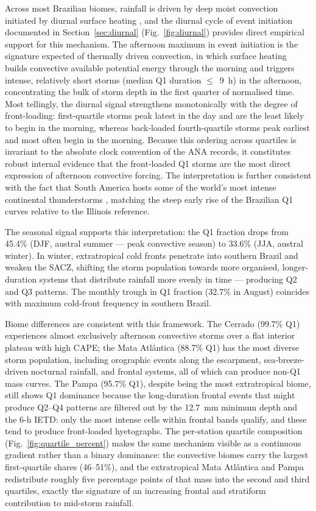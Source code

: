 \documentclass[a4paper,fleqn]{cas-sc}
\begin{document}
Across most Brazilian biomes, rainfall is driven by deep moist
convection initiated by diurnal surface heating \citep{Marengo2012},
and the diurnal cycle of event initiation documented in
Section~\ref{sec:diurnal} (Fig.~\ref{fig:diurnal}) provides direct
empirical support for this mechanism. The afternoon maximum in event
initiation is the signature expected of thermally driven convection, in
which surface heating builds convective available potential energy
through the morning and triggers intense, relatively short storms
(median Q1 duration $\leq$~9~h) in the afternoon, concentrating the bulk
of storm depth in the first quarter of normalised time. Most
tellingly, the diurnal signal strengthens monotonically with the degree
of front-loading: first-quartile storms peak latest in the day and are
the least likely to begin in the morning, whereas back-loaded
fourth-quartile storms peak earliest and most often begin in the
morning. Because this ordering across quartiles is invariant to the
absolute clock convention of the ANA records, it constitutes robust
internal evidence that the front-loaded Q1 storms are the most direct
expression of afternoon convective forcing. The interpretation is
further consistent with the fact that South America hosts some of the
world's most intense continental thunderstorms \citep{Zipser2006},
matching the steep early rise of the Brazilian Q1 curves relative to
the Illinois reference.

The seasonal signal supports this interpretation: the Q1 fraction
drops from 45.4\% (DJF, austral summer — peak convective season)
to 33.6\% (JJA, austral winter). In winter, extratropical cold fronts
penetrate into southern Brazil and weaken the SACZ, shifting the storm
population towards more organised, longer-duration systems that
distribute rainfall more evenly in time — producing Q2 and Q3
patterns. The monthly trough in Q1 fraction (32.7\% in August)
coincides with maximum cold-front frequency in southern Brazil.

Biome differences are consistent with this framework. The Cerrado
(99.7\% Q1) experiences almost exclusively afternoon convective
storms over a flat interior plateau with high CAPE; the Mata Atlântica
(88.7\% Q1) has the most diverse storm population, including
orographic events along the escarpment, sea-breeze-driven nocturnal
rainfall, and frontal systems, all of which can produce non-Q1 mass
curves. The Pampa (95.7\% Q1), despite being the most extratropical
biome, still shows Q1 dominance because the long-duration frontal
events that might produce Q2–Q4 patterns are filtered out by the
12.7~mm minimum depth and the 6-h IETD: only the most intense cells
within frontal bands qualify, and these tend to produce front-loaded
hyetographs. The per-station quartile composition
(Fig.~\ref{fig:quartile_percent}) makes the same mechanism visible as a
continuous gradient rather than a binary dominance: the convective
biomes carry the largest first-quartile shares (46–51\%), and the
extratropical Mata Atlântica and Pampa redistribute roughly five
percentage points of that mass into the second and third quartiles,
exactly the signature of an increasing frontal and stratiform
contribution to mid-storm rainfall.
\end{document}

